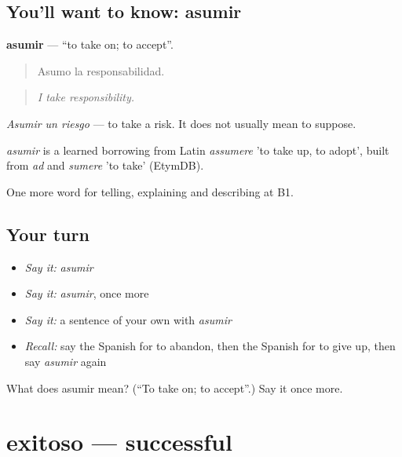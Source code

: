 \subsection*{You'll want to know: asumir}
\textbf{asumir} — \textquotedblleft{}to take on; to accept\textquotedblright{}.

\begin{quote}
Asumo la responsabilidad.
\end{quote}

\begin{quote}
\emph{I take responsibility.}
\end{quote}

\emph{Asumir un riesgo} — to take a risk. It does not usually mean to suppose.

\begin{cousinweb}
\emph{asumir} is a learned borrowing from Latin \emph{assumere} 'to take up, to adopt', built from \emph{ad} and \emph{sumere} 'to take' (EtymDB).
\end{cousinweb}

\begin{grammarlens}[title={What you've built}]
One more word for telling, explaining and describing at B1.
\end{grammarlens}

\subsection*{Your turn}
\begin{itemize}
\raggedright
  \item \emph{Say it:} \emph{asumir}
  \item \emph{Say it:} \emph{asumir}, once more
  \item \emph{Say it:} a sentence of your own with \emph{asumir}
  \item \emph{Recall:} say the Spanish for to abandon, then the Spanish for to give up, then say \emph{asumir} again
\end{itemize}

\begin{tcolorbox}[breakable,colback=teal!4,colframe=teal!35!black,title={Before you move on}]
What does asumir mean? (\textquotedblleft{}To take on; to accept\textquotedblright{}.) Say it once more.
\end{tcolorbox}
\section[exitoso]{exitoso — successful}

